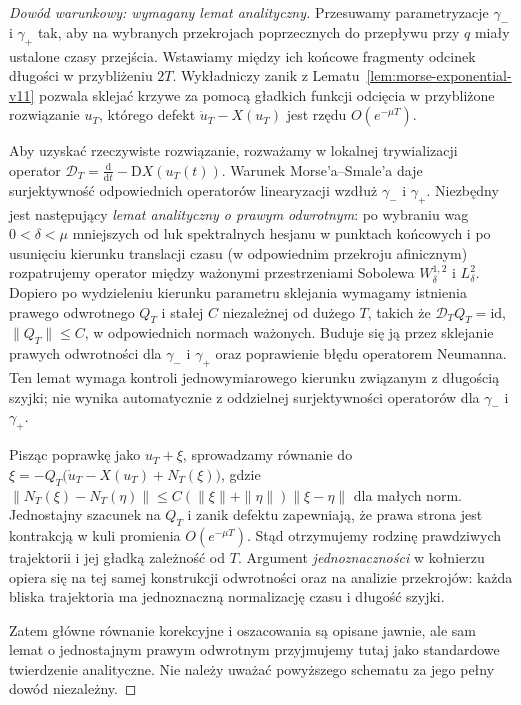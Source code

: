 \documentclass[11pt,a4paper,oneside]{report}
\newcommand{\id}{\mathrm{id}}
\newcommand{\D}{\mathrm D}
\newcommand{\dd}{\mathrm d}
\theoremstyle{plain}
\theoremstyle{definition}
\theoremstyle{remark}
\begin{document}
\begin{proof}[Dowód warunkowy: wymagany lemat analityczny]
Przesuwamy parametryzacje $\gamma_-$ i $\gamma_+$ tak,
aby na wybranych przekrojach poprzecznych do przepływu
przy $q$ miały ustalone czasy przejścia. Wstawiamy między
ich końcowe fragmenty odcinek długości w przybliżeniu $2T$.
Wykładniczy zanik z Lematu~\ref{lem:morse-exponential-v11}
pozwala sklejać krzywe za pomocą gładkich funkcji odcięcia
w przybliżone rozwiązanie $u_T$, którego defekt
$\dot u_T-X(u_T)$ jest rzędu $O(e^{-\mu T})$.

Aby uzyskać rzeczywiste rozwiązanie, rozważamy w lokalnej
trywializacji operator
$\mathcal D_T=\tfrac{\dd}{\dd t}-\D X(u_T(t))$.
Warunek Morse'a--Smale'a daje surjektywność odpowiednich
operatorów linearyzacji wzdłuż $\gamma_-$ i $\gamma_+$.
Niezbędny jest następujący \emph{lemat analityczny o prawym
odwrotnym}: po wybraniu wag $0<\delta<\mu$ mniejszych od luk
spektralnych hesjanu w punktach końcowych i po
usunięciu kierunku translacji czasu (w odpowiednim
przekroju afinicznym) rozpatrujemy operator między
ważonymi przestrzeniami Sobolewa $W^{1,2}_\delta$
i $L^2_\delta$. Dopiero po wydzieleniu kierunku
parametru sklejania wymagamy istnienia prawego odwrotnego
$Q_T$ i stałej $C$ niezależnej od dużego $T$, takich że
$\mathcal D_TQ_T=\id$, $\|Q_T\|\le C$, w odpowiednich
normach ważonych. Buduje się ją przez sklejanie prawych
odwrotności dla $\gamma_-$ i $\gamma_+$ oraz poprawienie
błędu operatorem Neumanna. Ten lemat wymaga kontroli
jednowymiarowego kierunku związanym z długością szyjki;
nie wynika automatycznie z oddzielnej surjektywności
operatorów dla $\gamma_-$ i $\gamma_+$.

Pisząc poprawkę jako $u_T+\xi$, sprowadzamy równanie do
$\xi=-Q_T\bigl(\dot u_T-X(u_T)+N_T(\xi)\bigr)$,
gdzie $\|N_T(\xi)-N_T(\eta)\|\le
C(\|\xi\|+\|\eta\|)\|\xi-\eta\|$ dla małych norm.
Jednostajny szacunek na $Q_T$ i zanik defektu zapewniają,
że prawa strona jest kontrakcją w kuli promienia
$O(e^{-\mu T})$. Stąd otrzymujemy rodzinę prawdziwych
trajektorii i jej gładką zależność od $T$.
Argument \emph{jednoznaczności} w kołnierzu opiera się na
tej samej konstrukcji odwrotności oraz na analizie
przekrojów: każda bliska trajektoria ma jednoznaczną
normalizację czasu i długość szyjki.

Zatem główne równanie korekcyjne i oszacowania są opisane
jawnie, ale sam lemat o jednostajnym prawym odwrotnym
przyjmujemy tutaj jako standardowe twierdzenie analityczne.
Nie należy uważać powyższego schematu za jego pełny
dowód niezależny.
\end{proof}
\end{document}
